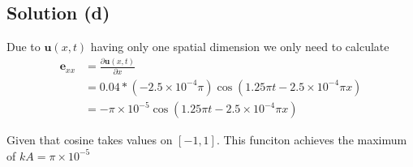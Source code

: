 \subsection*{Solution (d)}

Due to $\mathbf{u}(x,t)$ having only one spatial dimension we only need to calculate 
\begin{align*}
    \mathbf{e}_{xx} &= \frac{\partial \mathbf{u}(x,t)}{\partial x}\\
    &= 0.04 * (-2.5 \times 10^{-4}\pi) \cos(1.25\pi t - 2.5\times 10^{-4}\pi x)\\
    &=- \pi \times 10^{-5} \cos(1.25\pi t - 2.5\times 10^{-4}\pi x)
\end{align*}

Given that cosine takes values on $[-1,1]$. This funciton achieves the maximum of $kA = \pi \times 10^{-5}$